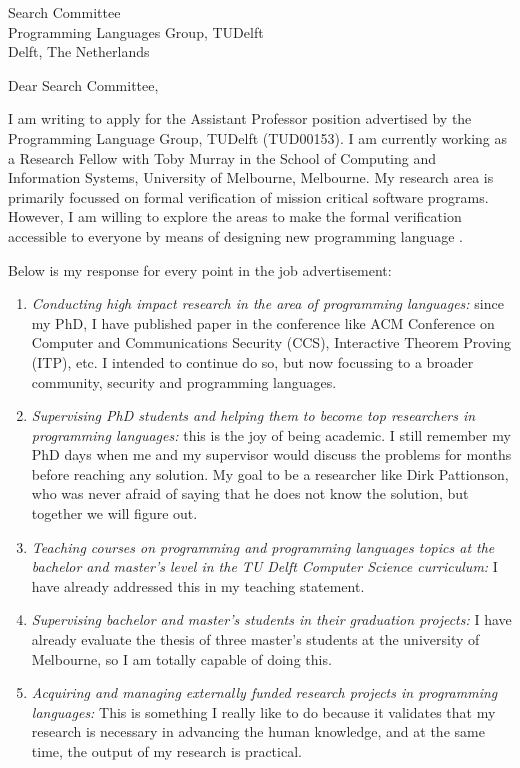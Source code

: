\documentclass{letter}
\begin{document}
\begin{letter}{Search Committee\\
Programming Languages Group, TUDelft\\
Delft, The Netherlands}


\opening{Dear Search Committee,}


I am writing to apply for the Assistant Professor position advertised by the Programming Language Group, TUDelft (TUD00153). 
I am currently working as a Research Fellow with Toby Murray in the School of Computing and Information Systems, University 
of Melbourne, Melbourne. My research area is primarily focussed on formal verification of mission critical software programs.  
However, I am willing to explore the areas to make the formal verification accessible to everyone by means of designing new programming language . 
 
Below is my response for every point in the job advertisement: 
\begin{enumerate}
\item \textit{Conducting high impact research in the area of programming languages:}
	since my PhD, I have published paper in the conference like ACM Conference on Computer and Communications Security (CCS), 
	Interactive Theorem Proving (ITP),  etc. I intended to continue do so, but now focussing to a broader community, security and programming languages. 
	
\item \textit{Supervising PhD students and helping them to become top researchers in programming languages:} 
  this is the joy of being academic. I still remember my PhD days when me and my supervisor would 
  discuss the problems for months before reaching any solution. My goal to be a researcher like Dirk Pattionson, who was never afraid of 
  saying that he does not know the solution, but together we will figure out.   
   
\item \textit{Teaching courses on programming and programming languages topics at the bachelor and master’s level in the TU Delft Computer Science curriculum:}
  I have already addressed this in my teaching statement.   	
  
\item \textit{Supervising bachelor and master’s students in their graduation projects:} 
  I have already evaluate the thesis of three master's students at the university of Melbourne, so I am totally capable of doing this. 
  
\item \textit{Acquiring and managing externally funded research projects in programming languages:}
  This is something I really like to do because it validates that my research is necessary in advancing the human knowledge, and at the 
  same time,  the output of my research is practical. 
 


\end{enumerate}
\end{letter}
\end{document}
